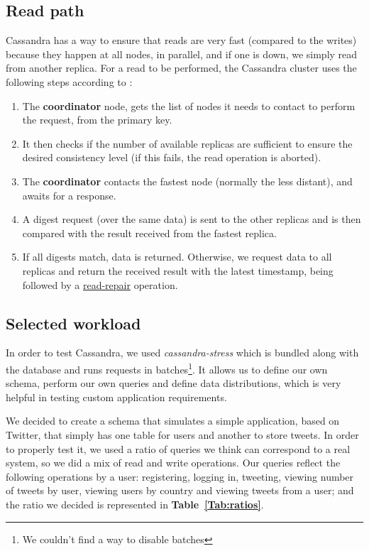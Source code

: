 \documentclass[runningheads]{llncs}
\begin{document}
\subsection{Read path}
Cassandra has a way to ensure that reads are very fast (compared to the writes) because they happen at all nodes, in parallel, and if one is down, we simply read from another replica.
For a read to be performed, the Cassandra cluster uses the following steps according to \cite{simplilearn}:
\begin{enumerate}
    \item The \textbf{coordinator} node, gets the list of nodes it needs to contact to perform the request, from the primary key.
    \item It then checks if the number of available replicas are sufficient to ensure the desired consistency level (if this fails, the read operation is aborted).
    \item The \textbf{coordinator} contacts the fastest node (normally the less distant), and awaits for a response.
    \item A digest request (over the same data) is sent to the other replicas and is then compared with the result received from the fastest replica.
    \item If all digests match, data is returned. Otherwise, we request data to all replicas and return the received result with the latest timestamp, being followed by a \underline{read-repair} operation.
\end{enumerate}

\subsection{Selected workload}

In order to test Cassandra, we used \emph{cassandra-stress} which is bundled along with the database and runs requests in batches\footnote{We couldn't find a way to disable batches}. It allows us to define our own schema, perform our own queries and define data distributions, which is very helpful in testing custom application requirements.\par
We decided to create a schema that simulates a simple application, based on Twitter, that simply has one table for users and another to store tweets. In order to properly test it, we used a ratio of queries we think can correspond to a real system, so we did a mix of read and write operations. Our queries reflect the following operations by a user: registering, logging in, tweeting, viewing number of tweets by user, viewing users by country and viewing tweets from a user; and the ratio we decided is represented in \textbf{Table~\ref{Tab:ratios}}.
\end{document}
